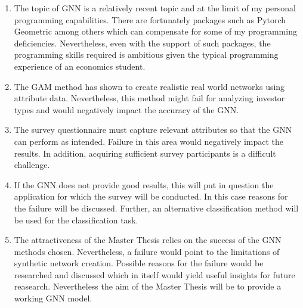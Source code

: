 \documentclass[12pt,a4paper]{article}
\begin{document}
	\begin{enumerate}
		
		\item The topic of GNN is a relatively recent topic and at the limit of my personal programming capabilities. There are fortunately packages
			such as Pytorch Geometric among others which can compensate for some of my programming deficiencies. Nevertheless, even with the support 
			of such packages, the programming skills required is ambitious given the typical programming experience of an economics student. 

		\item The GAM method has shown to create realistic real world networks using attribute data. Nevertheless, this method might fail for 
			analyzing investor types and would negatively impact the accuracy of the GNN.

		\item The survey questionnaire must capture relevant attributes so that the GNN can perform as intended. Failure in this area would negatively
			impact the results. In addition, acquiring sufficient survey participants is a difficult challenge.  

		\item If the GNN does not provide good results, this will put in question the application for which the survey will be conducted. In this case 
			reasons for the failure will be discussed. Further, an alternative classification method will be used for the classification task.

		\item The attractiveness of the Master Thesis relies on the success of the GNN methods chosen. Nevertheless, a failure would point to the 
			limitations of synthetic network creation. Possible reasons for the failure would be researched and discussed which in itself would yield
			useful insights for future reasearch. Nevertheless the aim of the Master Thesis will be to provide a working GNN model.

	\end{enumerate} 

	\pagebreak
	
	
\end{document}
